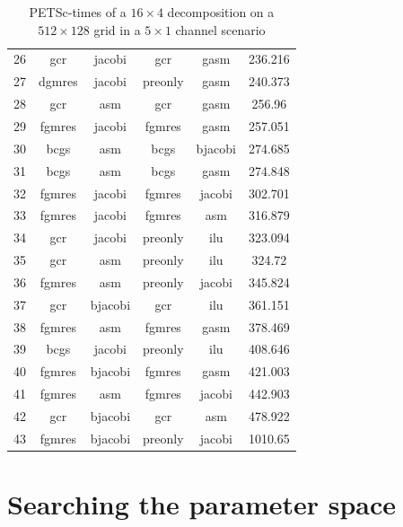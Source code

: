 \begin{table}[h]
\begin{tabular}{cccccc}
    26 & gcr & jacobi & gcr & gasm & 236.216 \\
    27 & dgmres & jacobi & preonly & gasm & 240.373 \\
    28 & gcr & asm & gcr & gasm & 256.96 \\
    29 & fgmres & jacobi & fgmres & gasm & 257.051 \\
    30 & bcgs & asm & bcgs & bjacobi & 274.685 \\
    31 & bcgs & asm & bcgs & gasm & 274.848 \\
    32 & fgmres & jacobi & fgmres & jacobi & 302.701 \\
    33 & fgmres & jacobi & fgmres & asm & 316.879 \\
    34 & gcr & jacobi & preonly & ilu & 323.094 \\
    35 & gcr & asm & preonly & ilu & 324.72 \\
    36 & fgmres & asm & preonly & jacobi & 345.824 \\
    37 & gcr & bjacobi & gcr & ilu & 361.151 \\
    38 & fgmres & asm & fgmres & gasm & 378.469 \\
    39 & bcgs & jacobi & preonly & ilu & 408.646 \\
    40 & fgmres & bjacobi & fgmres & gasm & 421.003 \\
    41 & fgmres & asm & fgmres & jacobi & 442.903 \\
    42 & gcr & bjacobi & gcr & asm & 478.922 \\
    43 & fgmres & bjacobi & preonly & jacobi & 1010.65 \\
    \hline
  \end{tabular}
  \caption{PETSc-times of a $16 \times 4$ decomposition on a $512 \times 128$ grid in a $5 \times 1$ channel scenario}
  \label{fig:petsc-opt-combinations-16x4}
\end{table}

\section{Searching the parameter space}

